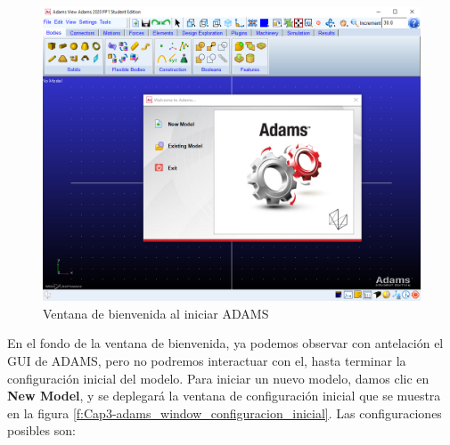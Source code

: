             \begin{figure}[H]
                \centering
                \includegraphics[width=0.7\linewidth]{Main/Chapter3/Images3/adams/Dialogo_Bienvenida.png}
                \caption{Ventana de bienvenida al iniciar ADAMS}
                \label{f:Cap3-adams_window_bienvenida}
            \end{figure} 
            
            En el fondo de la ventana de bienvenida, ya podemos observar con antelación el GUI de ADAMS, pero no podremos interactuar con el, hasta terminar la configuración inicial del modelo.
            Para iniciar un nuevo modelo, damos clic en \textbf{New Model}, y se deplegará la ventana de configuración inicial que se muestra en la figura \eqref{f:Cap3-adams_window_configuracion_inicial}. Las configuraciones posibles son:
            
